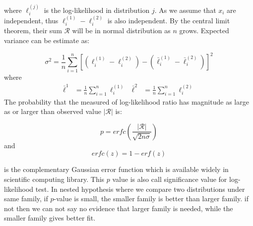 \begin{appendices}
where $ \ell_{i}^{(j)}$ is the log-likelihood in distribution $j$.
As we assume that $x_i$ are independent, thus $\ell_{i}^{(1)} - \ell_{i}^{(2)}$ is also independent. 
By the central limit theorem, their sum $\mathcal{R}$ will be in normal distribution as $n$ grows.
Expected variance can be estimate as:

\begin{equation}
	\sigma^2 = \frac{1}{n} \sum_{i=1}^{n}[(\ell_{i}^{(1)} - \ell_{i}^{(2)}) - (\bar{\ell}_{i}^{(1)} - \bar{\ell}_{i}^{(2)})]^2
\end{equation}
where 
\begin{align}
	\bar{\ell}^1 & = \frac{1}{n} \sum_{i=1}^{n} \ell_{i}^{(1)} & \bar{\ell}^2 & = \frac{1}{n} \sum_{i=1}^{n} \ell_{i}^{(2)}
\end{align}
The probability that the measured of log-likelihood ratio has magnitude as large as or larger than observed value $|\mathcal{R}|$ is: 

\begin{equation}
 p = erfc (\frac{|\mathcal{R}|} { \sqrt{2n\sigma}})
\end{equation}
and 
\begin{equation}
 erfc(z) = 1 - erf(z)
\end{equation}

is the complementary Gaussian error function which is available widely in scientific computing library.
This $p$ value is also call significance value for log-likelihood test. 
In nested hypothesis where we compare two distributions under same family, if $p$-value is small, the smaller family is better than larger family.
if not then we can not say no evidence that larger family is needed, while the smaller family gives better fit. 

\end{appendices}
